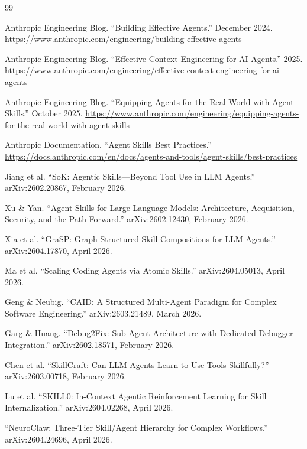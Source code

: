\documentclass[11pt,a4paper]{article}
\begin{document}
\begin{thebibliography}{99}

Anthropic Engineering Blog.
``Building Effective Agents.''
December 2024.
\url{https://www.anthropic.com/engineering/building-effective-agents}

Anthropic Engineering Blog.
``Effective Context Engineering for AI Agents.''
2025.
\url{https://www.anthropic.com/engineering/effective-context-engineering-for-ai-agents}

Anthropic Engineering Blog.
``Equipping Agents for the Real World with Agent Skills.''
October 2025.
\url{https://www.anthropic.com/engineering/equipping-agents-for-the-real-world-with-agent-skills}

Anthropic Documentation.
``Agent Skills Best Practices.''
\url{https://docs.anthropic.com/en/docs/agents-and-tools/agent-skills/best-practices}

Jiang et al.
``SoK: Agentic Skills---Beyond Tool Use in LLM Agents.''
arXiv:2602.20867, February 2026.

Xu \& Yan.
``Agent Skills for Large Language Models: Architecture, Acquisition, Security, and the Path Forward.''
arXiv:2602.12430, February 2026.

Xia et al.
``GraSP: Graph-Structured Skill Compositions for LLM Agents.''
arXiv:2604.17870, April 2026.

Ma et al.
``Scaling Coding Agents via Atomic Skills.''
arXiv:2604.05013, April 2026.

Geng \& Neubig.
``CAID: A Structured Multi-Agent Paradigm for Complex Software Engineering.''
arXiv:2603.21489, March 2026.

Garg \& Huang.
``Debug2Fix: Sub-Agent Architecture with Dedicated Debugger Integration.''
arXiv:2602.18571, February 2026.

Chen et al.
``SkillCraft: Can LLM Agents Learn to Use Tools Skillfully?''
arXiv:2603.00718, February 2026.

Lu et al.
``SKILL0: In-Context Agentic Reinforcement Learning for Skill Internalization.''
arXiv:2604.02268, April 2026.

``NeuroClaw: Three-Tier Skill/Agent Hierarchy for Complex Workflows.''
arXiv:2604.24696, April 2026.


\end{thebibliography}
\end{document}
